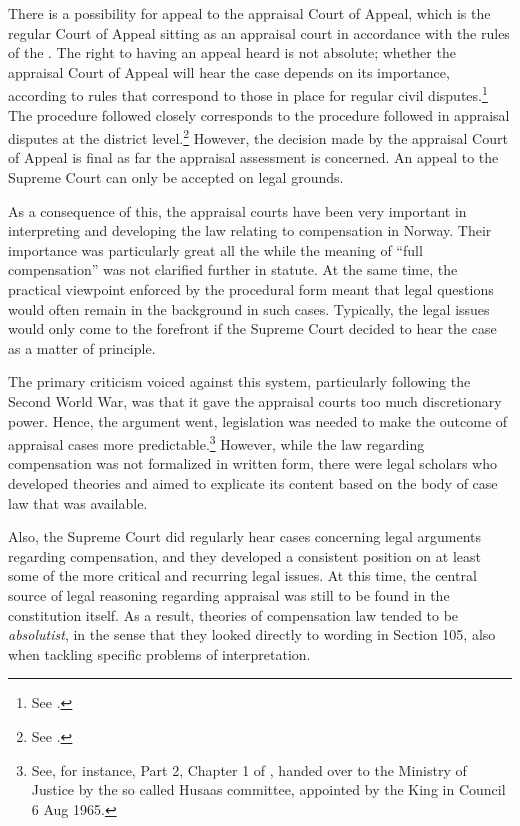 There is a possibility for appeal to the appraisal Court of Appeal, which is the regular Court of Appeal sitting as an appraisal court in accordance with the rules of the \cite{aa17}. The right to having an appeal heard is not absolute; whether the appraisal Court of Appeal will hear the case depends on its importance, according to rules that correspond to those in place for regular civil disputes.\footnote{See \cite[32]{aa17}.} The procedure followed closely corresponds to the procedure followed in appraisal disputes at the district level.\footnote{See \cite[38]{aa17}.} However, the decision made by the appraisal Court of Appeal is final as far the appraisal assessment is concerned. An appeal to the Supreme Court can only be accepted on legal grounds.

As a consequence of this, the appraisal courts have been very important in interpreting and developing the law relating to compensation in Norway. Their importance was particularly great all the while the meaning of ``full compensation'' was not clarified further in statute. At the same time, the practical viewpoint enforced by the procedural form meant that legal questions would often remain in the background in such cases. Typically, the legal issues would only come to the forefront if the Supreme Court decided to hear the case as a matter of principle. 

The primary criticism voiced against this system, particularly following the Second World War, was that it gave the appraisal courts too much discretionary power. Hence, the argument went, legislation was needed to make the outcome of appraisal cases more predictable.\footnote{See, for instance, Part 2, Chapter 1 of \cite{nut69}, handed over to the Ministry of Justice by the so called Husaas committee, appointed by the King in Council 6 Aug 1965.} However, while the law regarding compensation was not formalized in written form, there were legal scholars who developed theories and aimed to explicate its content based on the body of case law that was available.

Also, the Supreme Court did regularly hear cases concerning legal arguments regarding compensation, and they developed a consistent position on at least some of the more critical and recurring legal issues. At this time, the central source of legal reasoning regarding appraisal was still to be found in the constitution itself. As a result, theories of compensation law tended to be \emph{absolutist}, in the sense that they looked directly to wording in Section 105, also when tackling specific problems of interpretation. 

